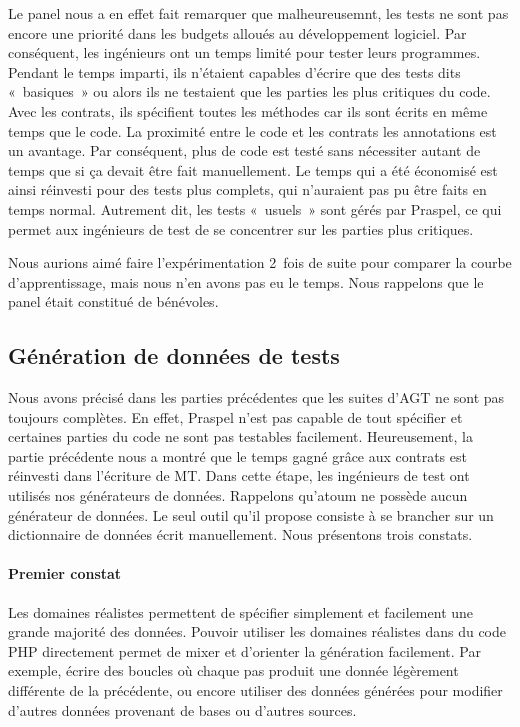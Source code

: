 Le panel nous a en effet fait remarquer que malheureusemnt, les tests ne sont
pas encore une priorité dans les budgets alloués au développement logiciel. Par
conséquent, les ingénieurs ont un temps limité pour tester leurs programmes.
Pendant le temps imparti, ils n'étaient capables d'écrire que des tests dits
«~basiques~» ou alors ils ne testaient que les parties les plus critiques du
code. Avec les contrats, ils spécifient toutes les méthodes car ils sont écrits
en même temps que le code. La proximité entre le code et les contrats \via les
annotations est un avantage. Par conséquent, plus de code est testé sans
nécessiter autant de temps que si ça devait être fait manuellement. Le temps qui
a été économisé est ainsi réinvesti pour des tests plus complets, qui n'auraient
pas pu être faits en temps normal. Autrement dit, les tests «~usuels~» sont
gérés par Praspel, ce qui permet aux ingénieurs de test de se concentrer sur les
parties plus critiques.

Nous aurions aimé faire l'expérimentation 2~fois de suite pour comparer la
courbe d'apprentissage, mais nous n'en avons pas eu le temps. Nous rappelons que
le panel était constitué de bénévoles.

\subsection{Génération de données de tests}
\label{subsection:experimentation:data}


Nous avons précisé dans les parties précédentes que les suites d'AGT ne sont pas
toujours complètes. En effet, Praspel n'est pas capable de tout spécifier et
certaines parties du code ne sont pas testables facilement. Heureusement, la
partie précédente nous a montré que le temps gagné grâce aux contrats est
réinvesti dans l'écriture de MT. Dans cette étape, les ingénieurs de test ont
utilisés nos générateurs de données. Rappelons qu'atoum ne possède aucun
générateur de données. Le seul outil qu'il propose consiste à se brancher sur un
dictionnaire de données écrit manuellement. Nous présentons trois constats.

\paragraph{Premier constat} Les domaines réalistes permettent de spécifier
simplement et facilement une grande majorité des données. Pouvoir utiliser les
domaines réalistes dans du code PHP directement permet de mixer et d'orienter la
génération facilement. Par exemple, écrire des boucles où chaque pas produit une
donnée légèrement différente de la précédente, ou encore utiliser des données
générées pour modifier d'autres données provenant de bases ou d'autres sources.

